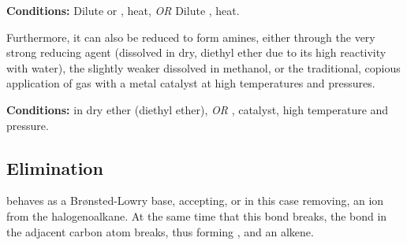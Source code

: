 				\vspace{1.5em}
				\vbox{\textbf{Conditions:}	\tabto{35mm}Dilute  or , heat, \textit{OR}
											\tabto{35mm}Dilute , heat.}




				Furthermore, it can also be reduced to form amines, either through the very strong reducing agent 
				(dissolved in dry, diethyl ether due to its high reactivity with water), the slightly weaker  dissolved in
				methanol, or the traditional, copious application of  gas with a metal catalyst at high temperatures and pressures.

				\vspace{1.5em}
				\vbox{\textbf{Conditions:}	\tabto{35mm} in dry ether (diethyl ether), \textit{OR}
											\tabto{35mm},  catalyst, high temperature and pressure.}







		\pagebreak
		\hypertarget{HydrogenHalideElimination}{}
		\subsection{Elimination}

			 behaves as a Brønsted-Lowry base, accepting, or in this case removing, an  ion from the halogenoalkane.
			At the same time that this  bond breaks, the  bond in the adjacent carbon atom breaks, thus forming
			, and an alkene.

